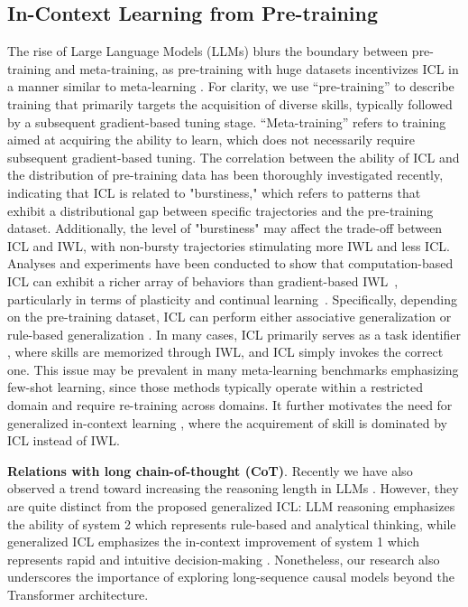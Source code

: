 \subsection{In-Context Learning from Pre-training}
The rise of Large Language Models (LLMs) blurs the boundary between pre-training and meta-training, as pre-training with huge datasets incentivizes ICL in a manner similar to meta-learning \citep{brown2020language, chen2021meta, coda2023meta}. For clarity, we use ``pre-training'' to describe training that primarily targets the acquisition of diverse skills, typically followed by a subsequent gradient-based tuning stage. ``Meta-training'' refers to training aimed at acquiring the ability to learn, which does not necessarily require subsequent gradient-based tuning.
The correlation between the ability of ICL and the distribution of pre-training data has been thoroughly investigated \cite{chan2022data,singh2024transient} recently, indicating that ICL is related to "burstiness," which refers to patterns that exhibit a distributional gap between specific trajectories and the pre-training dataset.
Additionally, the level of "burstiness" may affect the trade-off between ICL and IWL, with non-bursty trajectories stimulating more IWL and less ICL.
Analyses and experiments have been conducted to show that computation-based ICL can exhibit a richer array of behaviors than gradient-based IWL~\cite{chan2022transformers, von2023transformers, xieexplanation}, particularly in terms of plasticity and continual learning~\cite{lior2024computation}.
Specifically, depending on the pre-training dataset, ICL can perform either associative generalization or rule-based generalization \cite{chan2022transformers}. In many cases, ICL primarily serves as a task identifier \cite{wies2024learnability}, where skills are memorized through IWL, and ICL simply invokes the correct one. 
This issue may be prevalent in many meta-learning benchmarks emphasizing few-shot learning, since those methods typically operate within a restricted domain and require re-training across domains. 
It further motivates the need for generalized in-context learning \cite{kirsch2022general, kirsch2023towards, wang2024benchmarking}, where the acquirement of skill is dominated by ICL instead of IWL.

\textbf{Relations with long chain-of-thought (CoT)}. Recently we have also observed a trend toward increasing the reasoning length in LLMs \cite{openai24o1, deepseek-llm}. However, they are quite distinct from the proposed generalized ICL: LLM reasoning emphasizes the ability of system 2 which represents rule-based and analytical thinking, while generalized ICL emphasizes the in-context improvement of system 1 which represents rapid and intuitive decision-making \cite{wason1974dual,kahneman2011thinking}. Nonetheless, our research also underscores the importance of exploring long-sequence causal models beyond the Transformer architecture.

